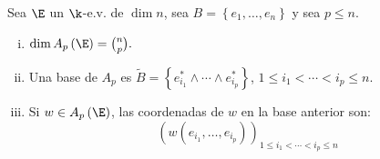 \begin{teo*}
    Sea $\E$ un $\k$-e.v. de $\dim n$, sea $B=\left\{
    e_1, \dots , e_n\right\}$ y sea $p\leq n$.
    \begin{enumerate}[i)]
        \item \label{teo_it1}
            $ \dim A_p\left( \E \right) = \binom{n}{p}. $
        \item \label{teo_it2}
            Una base de $A_p$ es $\tilde{B} = \left\{e_{i_1}^* \wedge \cdots \wedge e_{i_p}^* \right\}$, $1\leq i_1 < \cdots < i_p \leq n$.
        \item
            Si $w \in A_p\left( \E \right)$, las coordenadas de $w$ en la base anterior son:
            \[
                \left( w \left( e_{i_1}, \dots , e_{i_p} \right) \right)_{1\leq i_1 < \cdots < i_p \leq n}
            \]
    \end{enumerate}
\end{teo*}
